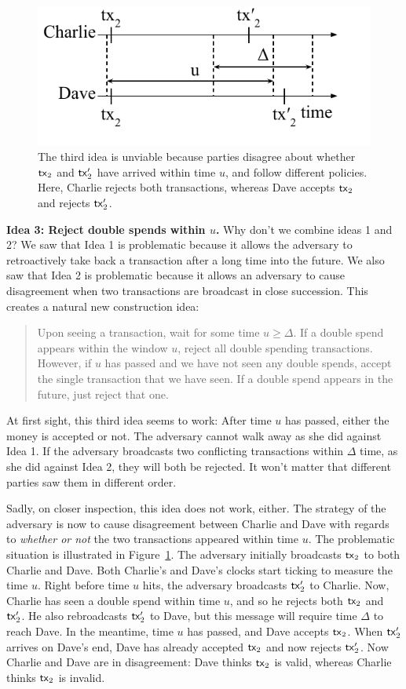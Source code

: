 \begin{figure}[h]
    \centering
    \includegraphics[width=0.45 \columnwidth,keepaspectratio]{figures/simple-idea-3.pdf}
    \caption{The third idea is unviable because parties
    disagree about whether $\mathsf{tx}_2$ and $\mathsf{tx}_2'$ have arrived within time $u$,
    and follow different policies. Here, Charlie rejects both transactions, whereas
    Dave accepts $\mathsf{tx}_2$ and rejects $\mathsf{tx}_2'$.}
    \label{fig.simple-idea-3}
\end{figure}

\noindent
\textbf{Idea 3: Reject double spends within $u$.} Why don't we combine ideas 1 and 2? We saw that
Idea 1 is problematic because it allows the adversary to retroactively take back a transaction after
a long time into the future. We also saw that Idea 2 is problematic because it allows an adversary to
cause disagreement when two transactions are broadcast in close succession. This creates a natural
new construction idea:

\begin{quote}
Upon seeing a transaction, wait for some time $u \geq \Delta$. If a double spend
appears within the window $u$, reject all double spending transactions. However, if $u$ has passed and we have
not seen any double spends, accept the single transaction that we have seen. If a double spend appears in
the future, just reject that one.
\end{quote}

At first sight, this third idea seems to work: After time $u$ has passed, either the money is accepted or not.
The adversary cannot walk away as she did against Idea 1. If the adversary broadcasts two conflicting
transactions within $\Delta$ time, as she did against Idea 2, they will both be rejected. It won't matter
that different parties saw them in different order.

Sadly, on closer inspection, this idea does not work,
either. The strategy of the adversary is now to cause disagreement between Charlie and Dave with
regards to \emph{whether or not} the two transactions appeared within time $u$. The problematic situation
is illustrated in Figure~\ref{fig.simple-idea-3}. The adversary initially broadcasts $\mathsf{tx}_2$
to both Charlie and Dave. Both Charlie's and Dave's clocks start ticking to measure the time $u$.
Right before time $u$ hits, the adversary broadcasts $\mathsf{tx}_2'$ to Charlie. Now, Charlie has seen
a double spend within time $u$, and so he rejects both $\mathsf{tx}_2$ and $\mathsf{tx}_2'$. He also rebroadcasts
$\mathsf{tx}_2'$ to Dave, but this message will require time $\Delta$ to reach Dave. In the meantime,
time $u$ has passed, and Dave accepts $\mathsf{tx}_2$. When $\mathsf{tx}_2'$ arrives on Dave's end, Dave has
already accepted $\mathsf{tx}_2$ and now rejects $\mathsf{tx}_2'$. Now Charlie and Dave are in disagreement:
Dave thinks $\mathsf{tx}_2$ is valid, whereas Charlie thinks $\mathsf{tx}_2$ is invalid.

